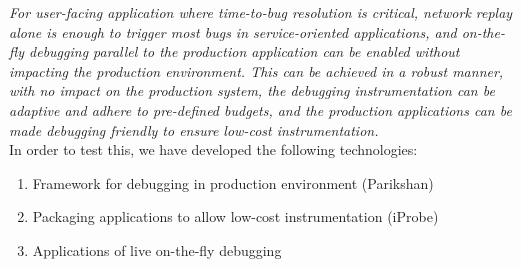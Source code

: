 \emph{For user-facing application where time-to-bug resolution is critical, network replay alone is enough to trigger most bugs in service-oriented applications, and on-the-fly debugging parallel to the production application can be enabled without impacting the production environment. This can be achieved in a robust manner, with no impact on the production system, the debugging instrumentation can be adaptive and adhere to pre-defined budgets, and the production applications can be made debugging friendly to ensure low-cost instrumentation.}\\


In order to test this, we have developed the following technologies:
\begin{enumerate}
	\setlength{\itemsep}{0pt}
	\item Framework for debugging in production environment (Parikshan)
	\item Packaging applications to allow low-cost instrumentation (iProbe)
	\item Applications of live on-the-fly debugging
\end{enumerate}


